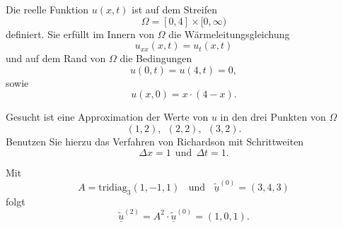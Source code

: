 Die reelle Funktion $u(x,t)$ ist auf dem Streifen
\[
\Omega = [0, 4] \times [0,\infty)
\]
definiert. Sie erfüllt im Innern von $\Omega$ die Wärmeleitungsgleichung
\[
u_{xx}(x,t) = u_{t}(x,t)
\]
und auf dem Rand von $\Omega$ die Bedingungen
\[
u(0,t) = u(4,t) = 0,
\]
sowie
\[
u(x,0) = x \cdot (4-x).
\]

\vspace{1mm}

Gesucht ist eine Approximation der Werte von $u$ in den drei Punkten von
$\Omega$
\[
(1,2), \ \  (2,2), \ \ (3,2).
\]
Benutzen Sie hierzu das Verfahren von Richardson mit Schrittweiten
\[
\Delta x = 1 \ \ \mbox{und} \ \  \Delta t = 1.
\]


\begin{loesung}
Mit
\[
A = \mbox{tridiag}_3(1,-1,1) \ \ \ \ \mbox{und}  \ \ \ \ \underline{\tilde u}^{(0)} = (3, 4, 3)
\]
folgt
\[
\underline{\tilde u}^{(2)} = A^2 \cdot \underline{\tilde u}^{(0)} = (1, 0, 1).
\]
\end{loesung}
